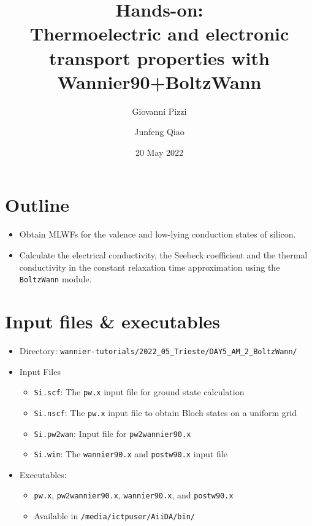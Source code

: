 \documentclass[11pt,a4paper]{article}
\begin{document}

\title{Hands-on:\\
  \textbf{Thermoelectric and electronic transport properties with Wannier90+BoltzWann}}

\author{Giovanni Pizzi \and Junfeng Qiao}

\date{20 May 2022}
\maketitle

\newcommand{\wan}{\texttt{Wannier90}\xspace}
\newcommand{\boltzwan}{\texttt{BoltzWann}\xspace}
\newcommand{\pwx}{\texttt{pw.x}\xspace}
\newcommand{\ptowx}{\textnormal{\texttt{pw2wannier90.x}}\xspace}
\newcommand{\wanx}{\textnormal{\texttt{wannier90.x}}\xspace}
\newcommand{\postwanx}{\textnormal{\texttt{postw90.x}}\xspace}

\section{Outline}

\begin{itemize}
  \item Obtain MLWFs for the valence and low-lying conduction states of silicon.
  \item Calculate the electrical conductivity, the Seebeck coefficient and the thermal
        conductivity in the constant relaxation time approximation using the \boltzwan
        module\cite{Pizzi2014,Pizzi2014a}.
\end{itemize}

\section{Input files \& executables}
\begin{itemize}
  \item{Directory: \texttt{wannier-tutorials/2022\_05\_Trieste/DAY5\_AM\_2\_BoltzWann/}}
  \item{Input Files}
  \begin{itemize}
    \item \texttt{Si.scf}: The \pwx input file for ground state
          calculation
    \item \texttt{Si.nscf}: The \pwx input file to obtain Bloch
          states on a uniform grid
    \item \texttt{Si.pw2wan}: Input file for \ptowx
    \item \texttt{Si.win}: The \wanx and \postwanx input file
  \end{itemize}
  \item Executables:
        \begin{itemize}
          \item \pwx, \ptowx, \wanx, and \postwanx
          \item Available in \texttt{/media/ictpuser/AiiDA/bin/}
        \end{itemize}
\end{itemize}
\end{document}

